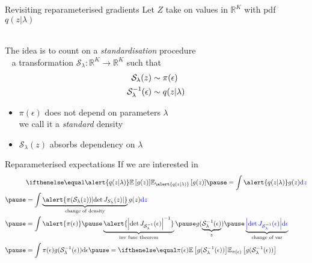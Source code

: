 \documentclass[14pt,dvipsnames]{beamer}
\begin{document}
\begin{frame}{Revisiting reparameterised gradients}
	Let $Z$ take on values in $\mathbb R^K$ with pdf $q(z|\lambda)$ \\
	
	~ \pause

	The idea is to count on a \emph{standardisation} procedure\\ \pause
	~ a transformation $\mathcal S_\lambda: \mathbb R^K \to \mathbb R^K$ such that \pause
	\begin{equation*}
	\begin{aligned}
	\mathcal S_\lambda(z) &\sim \pi(\epsilon) \\
 	{\mathcal S}^{-1}_\lambda(\epsilon) &\sim q(z|\lambda)
	\end{aligned}
	\end{equation*} 
	\begin{itemize}
		\item $\pi(\epsilon)$ does not depend on parameters $\lambda$\\
		we call it a \emph{standard} density \pause
		\item $\mathcal S_\lambda(z)$ absorbs dependency on $\lambda$ 
	\end{itemize}

\end{frame}

\begin{frame}{Reparameterised expectations}
	If we are interested in 
	\begin{equation*}
	\begin{aligned}
		&  \E[\alert{q(z|\lambda)}]{g(z)} \pause = \int \alert{q(z|\lambda)} g(z) \textcolor{blue}{\dd z} \\ \pause
		&= \int \underbrace{\alert{\pi(\mathcal S_\lambda(z)) \djac{S_\lambda}{z}}}_{\text{change of density}} g(z) \textcolor{blue}{\dd z} \\ \pause
		&= \int \alert{\pi(\epsilon)} \pause \underbrace{\alert{\djac{\inv{\mathcal S}_\lambda}{\epsilon}^{-1}}}_{\text{inv func theorem}} \pause g(\underbrace{\inv{\mathcal S}_\lambda(\epsilon)}_{z}) \pause \underbrace{\textcolor{blue}{\djac{\inv{\mathcal S}_\lambda}{\epsilon} \dd \epsilon}}_{\text{change of var}} \\ \pause
		&= \int \pi(\epsilon) g(\inv{\mathcal S}_\lambda(\epsilon))\dd \epsilon \pause = \E[\pi(\epsilon)]{g(\inv{\mathcal S}_\lambda(\epsilon)) }
	\end{aligned}
	\end{equation*}
\end{frame}
\end{document}
